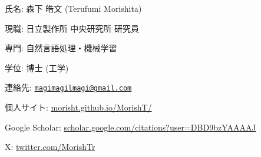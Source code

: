 \begin{cvsmallitemize}
  \item 氏名: 森下 皓文 (Terufumi Morishita)
  \item 現職: 日立製作所 中央研究所 研究員
  \item 専門: 自然言語処理・機械学習
  \item 学位: 博士 (工学)
  \item 連絡先: \href{mailto:magimagilmagi@gmail.com}{\texttt{magimagilmagi@gmail.com}}
  \item 個人サイト: \href{https://morisht.github.io/MorishT/}{morisht.github.io/MorishT/}
  \item Google Scholar: \href{https://scholar.google.com/citations?user=DBD9bzYAAAAJ}{scholar.google.com/citations?user=DBD9bzYAAAAJ}
  \item X: \href{https://twitter.com/MorishTr}{twitter.com/MorishTr}
\end{cvsmallitemize}
